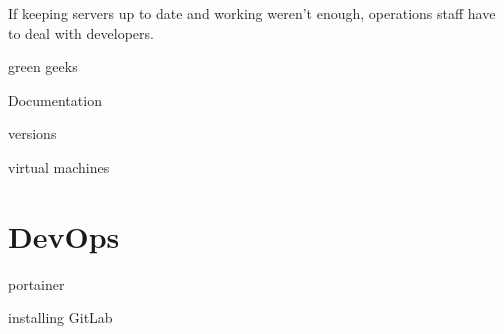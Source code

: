 \documentclass[titlepage]{article}
\begin{document}
If keeping servers up to date and working weren't enough, operations staff have to deal with developers. 

green geeks

Documentation

versions

virtual machines

\section{DevOps}

portainer

installing GitLab







\setlength{\bibleftmargin}{.125in}
\doublespacing


\nocite{*}
\end{document}
